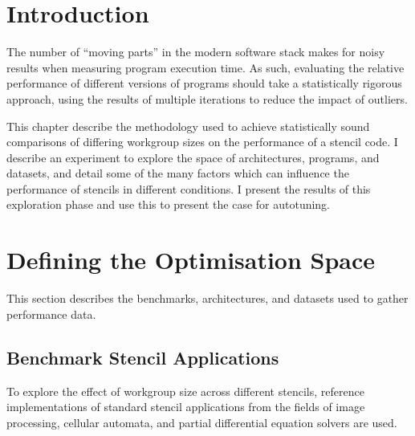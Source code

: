 \section{Introduction}

The number of ``moving parts'' in the modern software stack makes for
noisy results when measuring program execution time. As such,
evaluating the relative performance of different versions of programs
should take a statistically rigorous approach, using the results of
multiple iterations to reduce the impact of outliers.

This chapter describe the methodology used to achieve statistically
sound comparisons of differing workgroup sizes on the performance of a
stencil code. I describe an experiment to explore the space of
architectures, programs, and datasets, and detail some of the many
factors which can influence the performance of stencils in different
conditions. I present the results of this exploration phase and use
this to present the case for autotuning.


\section{Defining the Optimisation Space}

This section describes the benchmarks, architectures, and datasets
used to gather performance data.

\subsection{Benchmark Stencil Applications}

To explore the effect of workgroup size across different stencils,
reference implementations of standard stencil applications from the
fields of image processing, cellular automata, and partial
differential equation solvers are used.

